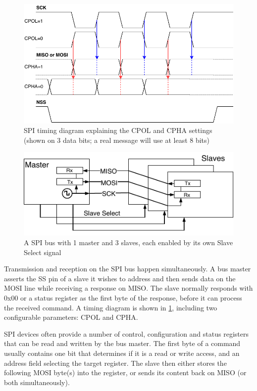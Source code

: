 \begin{figure}[h]
	\centering
	\includegraphics[scale=.9] {img/spi-timing.pdf}
	\caption[SPI timing diagram]{\label{fig:spi-timing}SPI timing diagram explaining the CPOL and CPHA settings (shown on 3 data bits; a real message will use at least 8 bits)}
\end{figure}

\begin{figure}[h]
\centering
\includegraphics[scale=1.1] {img/spi-multislave-redraw.pdf}
\caption[SPI master with multiple slaves]{\label{fig:spi-multislave}A SPI bus with 1 master and 3 slaves, each enabled by its own Slave Select signal}
\end{figure}

Transmission and reception on the \gls{SPI} bus happen simultaneously. A bus master asserts the \gls{SS} pin of a slave it wishes to address and then sends data on the \gls{MOSI} line while receiving a response on \gls{MISO}. The slave normally responds with 0x00 or a status register as the first byte of the response, before it can process the received command. A timing diagram is shown in \cref{fig:spi-timing}, including two configurable parameters: \gls{CPOL} and \gls{CPHA}.

\gls{SPI} devices often provide a number of control, configuration and status registers that can be read and written by the bus master. The first byte of a command usually contains one bit that determines if it is a read or write access, and an address field selecting the target register. The slave then either stores the following \gls{MOSI} byte(s) into the register, or sends its content back on \gls{MISO} (or both simultaneously).

